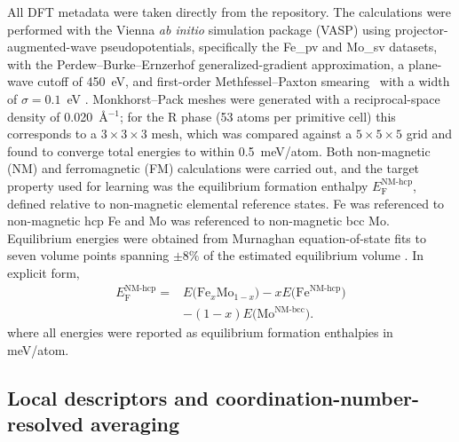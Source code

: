 \documentclass[prb,twocolumn,floatfix]{revtex4-2}
\newcommand{\efnmhcp}{\ensuremath{E_{\mathrm{F}}^{\mathrm{NM\mbox{-}hcp}}}}
\begin{document}
All DFT metadata were taken directly from the repository. The calculations were performed with the Vienna \emph{ab initio} simulation package (VASP) using projector-augmented-wave pseudopotentials, specifically the Fe\_pv and Mo\_sv datasets, with the Perdew--Burke--Ernzerhof generalized-gradient approximation, a plane-wave cutoff of 450~eV, and first-order Methfessel--Paxton smearing~\cite{MethfesselPaxton1989} with a width of $\sigma=0.1$~eV \cite{KresseFurthmueller1996,KresseJoubert1999,Blochl1994,PerdewBurkeErnzerhof1996}. Monkhorst--Pack meshes were generated with a reciprocal-space density of 0.020~\AA$^{-1}$; for the R phase (53 atoms per primitive cell) this corresponds to a $3\times 3\times 3$ mesh, which was compared against a $5\times 5\times 5$ grid and found to converge total energies to within 0.5~meV/atom. Both non-magnetic (NM) and ferromagnetic (FM) calculations were carried out, and the target property used for learning was the equilibrium formation enthalpy \efnmhcp, defined relative to non-magnetic elemental reference states. Fe was referenced to non-magnetic hcp Fe and Mo was referenced to non-magnetic bcc Mo. Equilibrium energies were obtained from Murnaghan equation-of-state fits to seven volume points spanning $\pm 8\%$ of the estimated equilibrium volume \cite{Murnaghan1944}. In explicit form,
\begin{align}
\efnmhcp ={}& E\bigl(\mathrm{Fe}_{x}\mathrm{Mo}_{1-x}\bigr) - x E\bigl(\mathrm{Fe}^{\mathrm{NM\mbox{-}hcp}}\bigr) \\
&- (1-x) E\bigl(\mathrm{Mo}^{\mathrm{NM\mbox{-}bcc}}\bigr).
\end{align}
where all energies were reported as equilibrium formation enthalpies in meV/atom.

\subsection{Local descriptors and coordination-number-resolved averaging}
\end{document}
